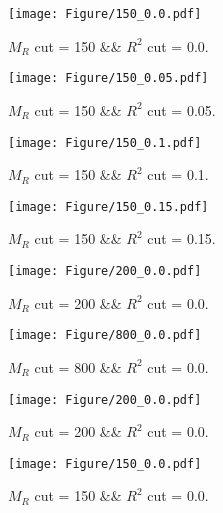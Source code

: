  
\begin{figure}[H] 
\begin{center} 
\texttt{[image: Figure/150\_0.0.pdf]} 
\caption{$M_R$ cut = 150 \&\& $R^2$ cut = 0.0.} 
\label{Fig:150_0.0} 
\end{center} 
\end{figure} 
 
 
\begin{figure}[H] 
\begin{center} 
\texttt{[image: Figure/150\_0.05.pdf]} 
\caption{$M_R$ cut = 150 \&\& $R^2$ cut = 0.05.} 
\label{Fig:150_0.05} 
\end{center} 
\end{figure} 
 
 
\begin{figure}[H] 
\begin{center} 
\texttt{[image: Figure/150\_0.1.pdf]} 
\caption{$M_R$ cut = 150 \&\& $R^2$ cut = 0.1.} 
\label{Fig:150_0.1} 
\end{center} 
\end{figure} 
 
 
\begin{figure}[H] 
\begin{center} 
\texttt{[image: Figure/150\_0.15.pdf]} 
\caption{$M_R$ cut = 150 \&\& $R^2$ cut = 0.15.} 
\label{Fig:150_0.15} 
\end{center} 
\end{figure} 
 
 
\begin{figure}[H] 
\begin{center} 
\texttt{[image: Figure/200\_0.0.pdf]} 
\caption{$M_R$ cut = 200 \&\& $R^2$ cut = 0.0.} 
\label{Fig:200_0.0} 
\end{center} 
\end{figure} 
 
 
\begin{figure}[H] 
\begin{center} 
\texttt{[image: Figure/800\_0.0.pdf]} 
\caption{$M_R$ cut = 800 \&\& $R^2$ cut = 0.0.} 
\label{Fig:800_0.0} 
\end{center} 
\end{figure} 
 
 
\begin{figure}[H] 
\begin{center} 
\texttt{[image: Figure/200\_0.0.pdf]} 
\caption{$M_R$ cut = 200 \&\& $R^2$ cut = 0.0.} 
\label{Fig:200_0.0} 
\end{center} 
\end{figure} 
 
 
\begin{figure}[H] 
\begin{center} 
\texttt{[image: Figure/150\_0.0.pdf]} 
\caption{$M_R$ cut = 150 \&\& $R^2$ cut = 0.0.} 
\label{Fig:150_0.0} 
\end{center} 
\end{figure} 
 
 

